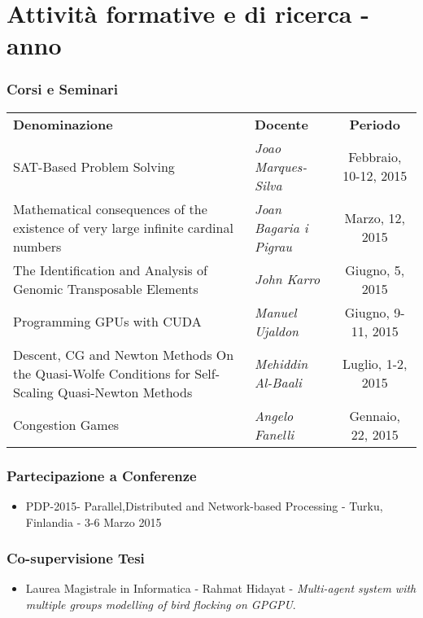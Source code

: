 \part{Attività formative e di ricerca -   anno}
\section{Corsi e Seminari }
	\begin{tabular}{ p{6cm}  l c }
	\toprule
	\rowcolor{gray!65}	
	\textbf{Denominazione} & \textbf{Docente} & \textbf{Periodo}  \\
		\rowcolor{gray!15}	
	SAT-Based Problem Solving & \textit{Joao Marques-Silva} &  Febbraio, 10-12,
	2015 \\
	  \rowcolor{gray!35}
	Mathematical consequences of the existence of very large 
	infinite cardinal numbers & \textit{Joan Bagaria i Pigrau} &  Marzo, 12,
	2015	 \\
		\rowcolor{gray!15}	
	The Identification and Analysis of
	Genomic Transposable Elements & \textit{John Karro} & Giugno, 5, 2015 \\ 
		\rowcolor{gray!35}	
	 Programming GPUs with CUDA & \textit{Manuel Ujaldon} &
	Giugno, 9-11, 2015 \\  
		\rowcolor{gray!15}	
	Descent, CG and Newton Methods On the Quasi-Wolfe Conditions for Self-Scaling Quasi-Newton Methods  & \textit{Mehiddin Al-Baali} &  Luglio,
	1-2, 2015\\
		\rowcolor{gray!35}	 	   
	Congestion Games   & \textit{Angelo Fanelli} &  Gennaio, 22,
	2015 \\
	  
	\bottomrule
\end{tabular}

\section{Partecipazione a  Conferenze}

\begin{itemize}
	\item PDP-2015- Parallel,Distributed and Network-based Processing - Turku,
	Finlandia - 3-6 Marzo 2015
\end{itemize}


\section{Co-supervisione Tesi}
\begin{itemize}
	\item Laurea Magistrale in Informatica - Rahmat Hidayat - \textit{Multi-agent system with multiple groups modelling of bird flocking on GPGPU}.
\end{itemize}

